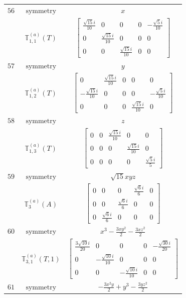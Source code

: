 \documentclass[fleqn,8pt,landscape]{jsarticle}
\begin{document}
\begin{longtable}{ccc}
$ 56 $ & $ \text{symmetry} $ & $ x $ \\
$  $ & $ \mathbb{T}_{1,1}^{(a)}(T) $ & $ \begin{bmatrix} \frac{\sqrt{15} i}{10} & 0 & 0 & 0 & - \frac{\sqrt{5} i}{10} \\ 0 & \frac{\sqrt{15} i}{10} & 0 & 0 & 0 \\ 0 & 0 & \frac{\sqrt{15} i}{10} & 0 & 0 \end{bmatrix} $ \\ \hline
$ 57 $ & $ \text{symmetry} $ & $ y $ \\
$  $ & $ \mathbb{T}_{1,2}^{(a)}(T) $ & $ \begin{bmatrix} 0 & \frac{\sqrt{15} i}{10} & 0 & 0 & 0 \\ - \frac{\sqrt{15} i}{10} & 0 & 0 & 0 & - \frac{\sqrt{5} i}{10} \\ 0 & 0 & 0 & \frac{\sqrt{15} i}{10} & 0 \end{bmatrix} $ \\ \hline
$ 58 $ & $ \text{symmetry} $ & $ z $ \\
$  $ & $ \mathbb{T}_{1,3}^{(a)}(T) $ & $ \begin{bmatrix} 0 & 0 & \frac{\sqrt{15} i}{10} & 0 & 0 \\ 0 & 0 & 0 & \frac{\sqrt{15} i}{10} & 0 \\ 0 & 0 & 0 & 0 & \frac{\sqrt{5} i}{5} \end{bmatrix} $ \\ \hline
$ 59 $ & $ \text{symmetry} $ & $ \sqrt{15} x y z $ \\
$  $ & $ \mathbb{T}_{3}^{(a)}(A) $ & $ \begin{bmatrix} 0 & 0 & 0 & \frac{\sqrt{6} i}{6} & 0 \\ 0 & 0 & \frac{\sqrt{6} i}{6} & 0 & 0 \\ 0 & \frac{\sqrt{6} i}{6} & 0 & 0 & 0 \end{bmatrix} $ \\ \hline
$ 60 $ & $ \text{symmetry} $ & $ x^{3} - \frac{3 x y^{2}}{2} - \frac{3 x z^{2}}{2} $ \\
$  $ & $ \mathbb{T}_{3,1}^{(a)}(T,1) $ & $ \begin{bmatrix} \frac{3 \sqrt{10} i}{20} & 0 & 0 & 0 & - \frac{\sqrt{30} i}{20} \\ 0 & - \frac{\sqrt{10} i}{10} & 0 & 0 & 0 \\ 0 & 0 & - \frac{\sqrt{10} i}{10} & 0 & 0 \end{bmatrix} $ \\ \hline
$ 61 $ & $ \text{symmetry} $ & $ - \frac{3 x^{2} y}{2} + y^{3} - \frac{3 y z^{2}}{2} $ \\

\end{longtable}
\end{document}
